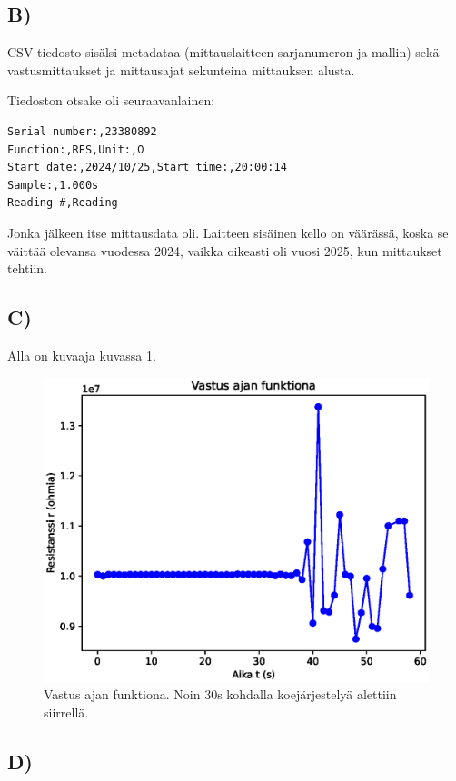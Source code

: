 \documentclass{article}
\begin{document}
\subsection*{B)}
CSV-tiedosto sisälsi metadataa (mittauslaitteen sarjanumeron ja mallin) sekä vastusmittaukset 
ja mittausajat sekunteina mittauksen alusta.

Tiedoston otsake oli seuraavanlainen:

\begin{verbatim}
Serial number:,23380892
Function:,RES,Unit:,Ω
Start date:,2024/10/25,Start time:,20:00:14
Sample:,1.000s
Reading #,Reading
\end{verbatim}

Jonka jälkeen itse mittausdata oli. Laitteen sisäinen kello on väärässä, koska se väittää olevansa vuodessa 2024, 
vaikka oikeasti oli vuosi 2025, kun mittaukset tehtiin.

\subsection*{C)}
Alla on kuvaaja kuvassa 1.
\begin{figure}[!h]
    \centering
    \includegraphics[width=1.0\linewidth]{hairio_plot.eps}
    \caption{Vastus ajan funktiona. Noin 30s kohdalla koejärjestelyä alettiin siirrellä.}
    \label{fig:hairio_plotting}
\end{figure}

\subsection*{D)}
\end{document}
